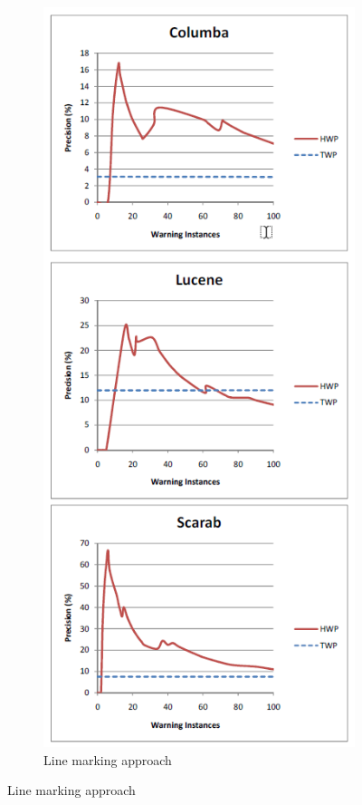 \documentclass{article}
\begin{document}
\begin{figure}[H]
\begin{subfigure}{0.4\textwidth}
         \includegraphics[scale=0.5]{./src/which_warnings_results.png}
         \caption{Line marking approach}\label{which_warnings:results}
     \end{subfigure}
 \end{figure}
\end{document}

